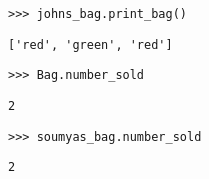 \begin{lstlisting}
>>> johns_bag.print_bag()
\end{lstlisting}
\begin{solution}[.2in]
\begin{lstlisting}
['red', 'green', 'red']
\end{lstlisting}
\end{solution}

\begin{lstlisting}
>>> Bag.number_sold
\end{lstlisting}
\begin{solution}[.2in]
\begin{lstlisting}
2
\end{lstlisting}
\end{solution}

\begin{lstlisting}
>>> soumyas_bag.number_sold
\end{lstlisting}
\begin{solution}[.2in]
\begin{lstlisting}
2
\end{lstlisting}
\end{solution}

